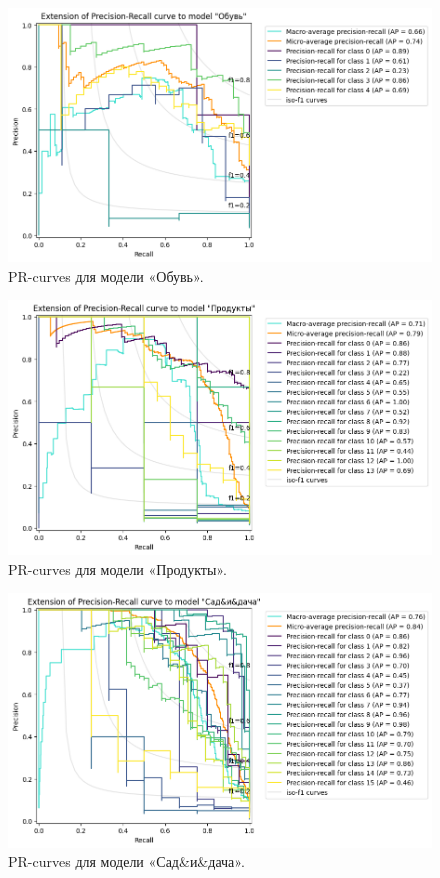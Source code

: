 \documentclass[a4paper,12pt]{extarticle}
\begin{document}
\begin{figure}[hbtp]
	\centering
	\includegraphics[scale=0.7]{pr_curves/prcurve_Обувь.png}
	\caption{PR-curves для модели «Обувь».}
	\label{fig:prcurve_Обувь}
\end{figure}

\begin{figure}[hbtp]
	\centering
	\includegraphics[scale=0.7]{pr_curves/prcurve_Продукты.png}
	\caption{PR-curves для модели «Продукты».}
	\label{fig:prcurve_Продукты}
\end{figure}

\begin{figure}[hbtp]
	\centering
	\includegraphics[scale=0.7]{pr_curves/prcurve_Сад&и&дача.png}
	\caption{PR-curves для модели «Сад\&и\&дача».}
	\label{fig:prcurve_Сад&и&дача}
\end{figure}
\end{document}
